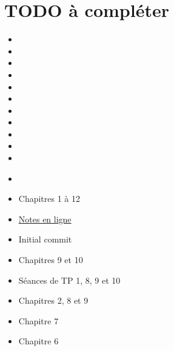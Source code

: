 \section{TODO à compléter \textcolor{red}{\danger}}
\begin{itemize}
  \item {}
  \item {}
  \item {}
  \item {}
  \item {}
  \item {}
  \item {}
  \item {}
  \item {}
  \item {}
  \item {}
  \item {}\\
\end{itemize}
\noindent
{}
  \begin{itemize}
    \item Chapitres 1 à 12
    \item \href{https://dl.dropboxusercontent.com/u/44092863/Graph_Theory_Romain_Capron.pdf}{Notes en ligne}
  \end{itemize}
  \begin{itemize}
    \item Initial commit
    \item Chapitres 9 et 10
    \item Séances de TP 1, 8, 9 et 10
  \end{itemize}
  \begin{itemize}
    \item Chapitres 2, 8 et 9
  \end{itemize}
  \begin{itemize}
    \item Chapitre 7
  \end{itemize}
  \begin{itemize}
    \item Chapitre 6
  \end{itemize}

